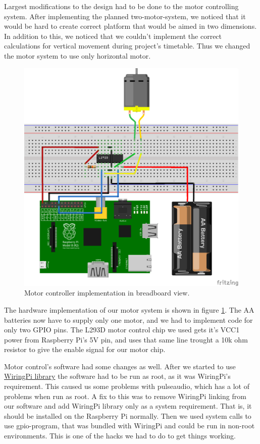 \documentclass[english,11pt,twoside,a4paper]{article}
\begin{document}
Largest modifications to the design had to be done to the motor controlling system. After implementing the planned two-motor-system, we noticed that it would be hard to create correct platform that would be aimed in two dimensions. In addition to this, we noticed that we couldn't implement the correct calculations for vertical movement during project's timetable. Thus we changed the motor system to use only horizontal motor.

\begin{figure}
  \begin{center}
    \includegraphics[scale=0.75]{motor_controllers_l293d_impl_bb.png}
    \caption{Motor controller implementation in breadboard view.}
  \end{center}
  \label{l293d_bb_impl}
\end{figure}

The hardware implementation of our motor system is shown in figure \ref{l293d_bb_impl}. The AA batteries now have to supply only one motor, and we had to implement code for only two GPIO pins. The L293D motor control chip we used gets it's VCC1 power from Raspberry Pi's 5V pin, and uses that same line trought a 10k ohm resistor to give the enable signal for our motor chip.

Motor control's software had some changes as well. After we started to use \href{http://wiringpi.com}{WiringPi library} the software had to be run as root, as it was WiringPi's requirement. This caused us some problems with pulseaudio, which has a lot of problems when run as root. A fix to this was to remove WiringPi linking from our software and add WiringPi library only as a system requirement. That is, it should be installed on the Raspberry Pi normally. Then we used system calls to use gpio-program, that was bundled with WiringPi and could be run in non-root environments. This is one of the hacks we had to do to get things working.
\end{document}
